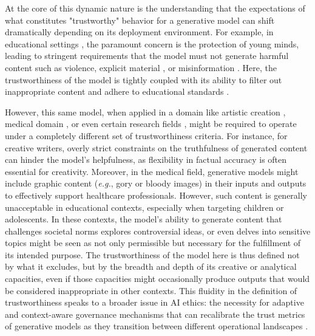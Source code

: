 At the core of this dynamic nature is the understanding that the expectations of what constitutes "trustworthy" behavior for a generative model can shift dramatically depending on its deployment environment. For example, in educational settings \cite{KASNECI2023102274, george2023potential}, the paramount concern is the protection of young minds, leading to stringent requirements that the model must not generate harmful content such as violence, explicit material \cite{miao2024t2vsafetybench}, or misinformation \cite{huang2023harnessing, 10.1145/3589335.3651509}. Here, the trustworthiness of the model is tightly coupled with its ability to filter out inappropriate content and adhere to educational standards \cite{merlyn2024, merlyn2024education, merlyn2024education}.

However, this same model, when applied in a domain like artistic creation \cite{abuzuraiq2024towards}, medical domain \cite{han2024towards}, or even certain research fields \cite{peng2023study, zhao2023competeai, jin2024agentreview, salah2023may, zhang2024cybench, roohani2024biodiscoveryagent}, might be required to operate under a completely different set of trustworthiness criteria. For instance, for creative writers, overly strict constraints on the truthfulness of generated content can hinder the model’s helpfulness, as flexibility in factual accuracy is often essential for creativity. Moreover, in the medical field, generative models might include graphic content (\emph{e.g.}, gory or bloody images) in their inputs and outputs to effectively support healthcare professionals. However, such content is generally unacceptable in educational contexts, especially when targeting children or adolescents. In these contexts, the model's ability to generate content that challenges societal norms explores controversial ideas, or even delves into sensitive topics might be seen as not only permissible but necessary for the fulfillment of its intended purpose. The trustworthiness of the model here is thus defined not by what it excludes, but by the breadth and depth of its creative or analytical capacities, even if those capacities might occasionally produce outputs that would be considered inappropriate in other contexts. This fluidity in the definition of trustworthiness speaks to a broader issue in AI ethics: the necessity for adaptive and context-aware governance mechanisms that can recalibrate the trust metrics of generative models as they transition between different operational landscapes \cite{deloitte2024, wtw2024}. 


